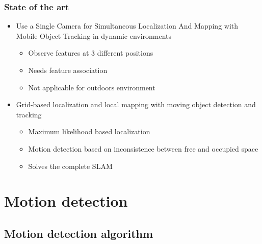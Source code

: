 \documentclass{beamer}
\begin{document}
	\begin{frame}
		\frametitle{State of the art}
		
			\begin{itemize}
			\item Use a Single Camera for Simultaneous Localization And Mapping with  Mobile Object Tracking in dynamic environments \cite{Migliore_2009_ICRA}
				\begin{itemize}			
				\item Observe features at 3 different positions
				\item Needs feature association
				\item Not applicable for outdoors environment 
				\end{itemize}		
			\item Grid-based localization and local mapping with moving object detection and tracking \cite{Vu201158}
				\begin{itemize}		
				\item Maximum likelihood based localization	
				\item Motion detection based on inconsistence between free and occupied space
				\item Solves the complete SLAM
				\end{itemize}	
			\end{itemize}		
	\end{frame}


\section{Motion detection}

\subsection*{Motion detection algorithm}
\end{document}
